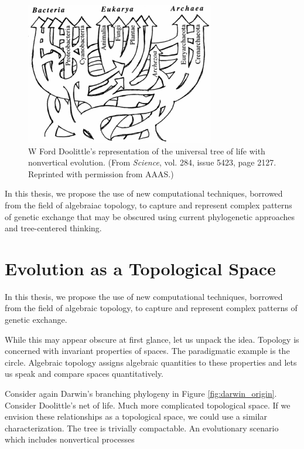 \begin{figure}
\includegraphics[width=\columnwidth]{./fig/introduction/doolittle_tree.png}
\caption[Ford Doolittle's Tree]{W Ford Doolittle's representation of the universal tree of life with nonvertical evolution. (From \emph{Science}, vol. 284, issue 5423, page 2127. Reprinted with permission from AAAS.)}
\label{fig:doolittle_tree}
\end{figure}

In this thesis, we propose the use of new computational techniques, borrowed from the field of algebraiac topology, to capture and represent complex patterns of genetic exchange that may be obscured using current phylogenetic approaches and tree-centered thinking.

\section{Evolution as a Topological Space}

In this thesis, we propose the use of new computational techniques, borrowed from the field of algebraic topology, to capture and represent complex patterns of genetic exchange.

While this may appear obscure at first glance, let us unpack the idea.
Topology is concerned with invariant properties of spaces.
The paradigmatic example is the circle.
Algebraic topology assigns algebraic quantities to these properties and lets us speak and compare spaces quantitatively.

Consider again Darwin's branching phylogeny in Figure \ref{fig:darwin_origin}.
Consider Doolittle's net of life.
Much more complicated topological space.
If we envision these relationships as a topological space, we could use a similar characterization.
The tree is trivially compactable.
An evolutionary scenario which includes nonvertical processes


